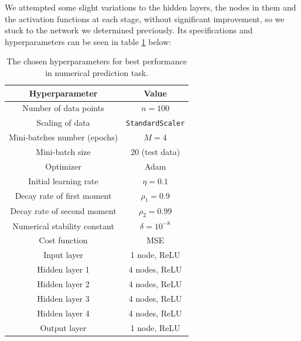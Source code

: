 We attempted some slight variations to the hidden layers, the nodes in them and the activation functions at each stage, without significant improvement, so we stuck to the network we determined previously. Its specifications and hyperparameters can be seen in table \ref{tab:numericalprediction} below: 
\begin{table}[h!]
  \centering
  \small
  \begin{tabular}{|c|c|}
    \hline
    \textbf{Hyperparameter} & \textbf{Value} \\
    \hline
    Number of data points & $n = 100$ \\
    \hline
    Scaling of data & \texttt{StandardScaler} \\
    \hline
    Mini-batches number (epochs) & $M = 4$ \\
    \hline
    Mini-batch size & $20$ (test data) \\
    \hline
    Optimizer & Adam \\
    \hline
    Initial learning rate & $\eta = 0.1$ \\
    \hline
    Decay rate of first moment & $\rho_1 = 0.9$ \\
    \hline
    Decay rate of second moment & $\rho_2 = 0.99$ \\
    \hline
    Numerical stability constant & $\delta = 10^{-8}$ \\
    \hline
    Cost function & MSE \\
    \hline
    Input layer & 1 node, ReLU \\
    \hline
    Hidden layer 1 & 4 nodes, ReLU \\
    \hline
    Hidden layer 2 & 4 nodes, ReLU \\
    \hline
    Hidden layer 3 & 4 nodes, ReLU \\
    \hline
    Hidden layer 4 & 4 nodes, ReLU \\
    \hline
    Output layer & 1 node, ReLU \\
    \hline
  \end{tabular}
  \caption{The chosen hyperparameters for best performance in numerical prediction task.}
  \label{tab:numericalprediction}
\end{table}

